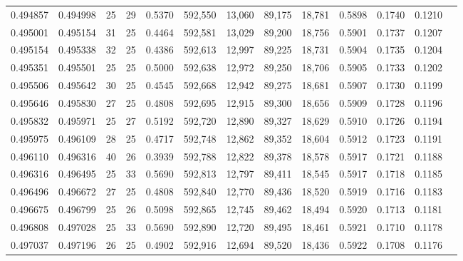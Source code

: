 \begin{tabular}{rrrrrrrrrrrrr}
0.494857 & 0.494998 &    25 &  29 &                                     0.5370 & 592,550 &  13,060 &  89,175 &  18,781 & 0.5898 & 0.1740 & 0.1210 \\
0.495001 & 0.495154 &    31 &  25 &                                     0.4464 & 592,581 &  13,029 &  89,200 &  18,756 & 0.5901 & 0.1737 & 0.1207 \\
0.495154 & 0.495338 &    32 &  25 &                                     0.4386 & 592,613 &  12,997 &  89,225 &  18,731 & 0.5904 & 0.1735 & 0.1204 \\
0.495351 & 0.495501 &    25 &  25 &                                     0.5000 & 592,638 &  12,972 &  89,250 &  18,706 & 0.5905 & 0.1733 & 0.1202 \\
0.495506 & 0.495642 &    30 &  25 &                                     0.4545 & 592,668 &  12,942 &  89,275 &  18,681 & 0.5907 & 0.1730 & 0.1199 \\
0.495646 & 0.495830 &    27 &  25 &                                     0.4808 & 592,695 &  12,915 &  89,300 &  18,656 & 0.5909 & 0.1728 & 0.1196 \\
0.495832 & 0.495971 &    25 &  27 &                                     0.5192 & 592,720 &  12,890 &  89,327 &  18,629 & 0.5910 & 0.1726 & 0.1194 \\
0.495975 & 0.496109 &    28 &  25 &                                     0.4717 & 592,748 &  12,862 &  89,352 &  18,604 & 0.5912 & 0.1723 & 0.1191 \\
0.496110 & 0.496316 &    40 &  26 &                                     0.3939 & 592,788 &  12,822 &  89,378 &  18,578 & 0.5917 & 0.1721 & 0.1188 \\
0.496316 & 0.496495 &    25 &  33 &                                     0.5690 & 592,813 &  12,797 &  89,411 &  18,545 & 0.5917 & 0.1718 & 0.1185 \\
0.496496 & 0.496672 &    27 &  25 &                                     0.4808 & 592,840 &  12,770 &  89,436 &  18,520 & 0.5919 & 0.1716 & 0.1183 \\
0.496675 & 0.496799 &    25 &  26 &                                     0.5098 & 592,865 &  12,745 &  89,462 &  18,494 & 0.5920 & 0.1713 & 0.1181 \\
0.496808 & 0.497028 &    25 &  33 &                                     0.5690 & 592,890 &  12,720 &  89,495 &  18,461 & 0.5921 & 0.1710 & 0.1178 \\
0.497037 & 0.497196 &    26 &  25 &                                     0.4902 & 592,916 &  12,694 &  89,520 &  18,436 & 0.5922 & 0.1708 & 0.1176 \\

\end{tabular}
